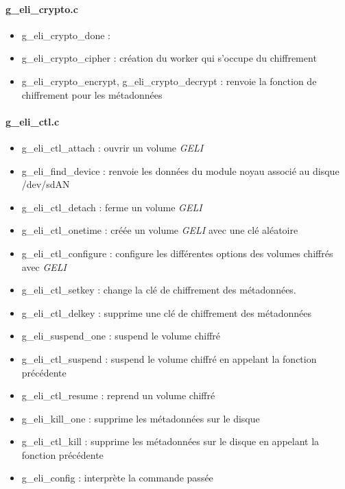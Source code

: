\paragraph{g\_eli\_crypto.c}
\begin{itemize}
	\item g\_eli\_crypto\_done : 
	\item g\_eli\_crypto\_cipher : création du worker qui s'occupe du 
		chiffrement
	\item g\_eli\_crypto\_encrypt, g\_eli\_crypto\_decrypt : 
		renvoie la fonction de chiffrement pour les métadonnées
\end{itemize}

\paragraph{g\_eli\_ctl.c}
\begin{itemize}
	\item g\_eli\_ctl\_attach : ouvrir un volume {\em GELI}
	\item g\_eli\_find\_device : renvoie les données du module noyau 
		associé au disque /dev/sdAN
	\item g\_eli\_ctl\_detach : ferme un volume {\em GELI}
	\item g\_eli\_ctl\_onetime : créée un volume {\em GELI} avec une clé
		aléatoire
	\item g\_eli\_ctl\_configure : configure les différentes options des
		volumes chiffrés avec {\em GELI}
	\item g\_eli\_ctl\_setkey : change la clé de chiffrement des 
		métadonnées.
	\item g\_eli\_ctl\_delkey : supprime une clé de chiffrement des 
		métadonnées
	\item g\_eli\_suspend\_one : suspend le volume chiffré
	\item g\_eli\_ctl\_suspend : suspend le volume chiffré en appelant la 
		fonction précédente
	\item g\_eli\_ctl\_resume : reprend un volume chiffré
	\item g\_eli\_kill\_one : supprime les métadonnées sur le disque
	\item g\_eli\_ctl\_kill : supprime les métadonnées sur le disque en 
		appelant la fonction précédente
	\item g\_eli\_config : interprète la commande passée
\end{itemize}
